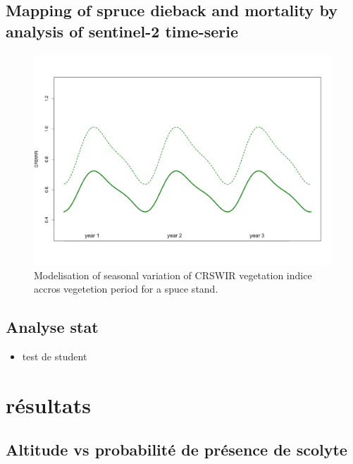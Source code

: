 \documentclass[3p,times]{elsarticle}
\begin{document}
\subsection{Mapping of spruce dieback and mortality by analysis of sentinel-2 time-serie}
\citep{bolyn_forest_2018}

\citep{grabska_forest_2019,ma_tree_2021,abdullah_sentinel-2_2019}

\begin{figure}
	\centering
	\includegraphics[width=\textwidth]{fctHarmo-page001.png}
	\caption{Modelisation of seasonal variation of CRSWIR vegetation indice accros vegetetion period for a spuce stand.}
	\label{fig:harmo}
\end{figure}

\subsection{Analyse stat}
\begin{itemize}
	\item test de student 
\end{itemize}

\section{résultats}

\subsection{ Altitude vs probabilité de présence de scolyte}
\end{document}
